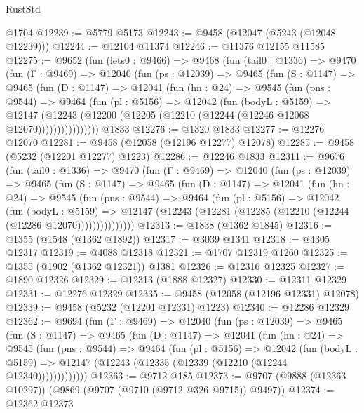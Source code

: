 \begin{lexlean}{RustStd}
\begin{coremodule}
    @1704
@12239 := @5779 @5173
@12243 := @9458 (@12047 (@5243 (@12048 @12239)))
@12244 := @12104 @11374
@12246 := @11376 @12155 @11585
@12275 := @9652
    (fun (lets0 : @9466) =>
    @9468
      (fun (tail0 : @1336) =>
      @9470
        (fun (Γ : @9469) =>
        @12040
          (fun (ps : @12039) =>
          @9465
            (fun (S : @1147) =>
            @9465
              (fun (D : @1147) =>
              @12041
                (fun (hn : @24) =>
                @9545
                  (fun (pns : @9544) =>
                  @9464
                    (fun (pl : @5156) =>
                    @12042
                      (fun (bodyL : @5159) =>
                      @12147
                        (@12243
                          (@12200 (@12205 (@12210 (@12244 (@12246 @12068 @12070))))))))))))))))
    @1833
@12276 := @1320 @1833
@12277 := @12276 @12070
@12281 := @9458 (@12058 (@12196 @12277) @12078)
@12285 := @9458 (@5232 (@12201 @12277) @1223)
@12286 := @12246 @1833
@12311 := @9676
    (fun (tail0 : @1336) =>
    @9470
      (fun (Γ : @9469) =>
      @12040
        (fun (ps : @12039) =>
        @9465
          (fun (S : @1147) =>
          @9465
            (fun (D : @1147) =>
            @12041
              (fun (hn : @24) =>
              @9545
                (fun (pns : @9544) =>
                @9464
                  (fun (pl : @5156) =>
                  @12042
                    (fun (bodyL : @5159) =>
                    @12147 (@12243 (@12281 (@12285 (@12210 (@12244 (@12286 @12070)))))))))))))))
@12313 := @1838 (@1362 @1845)
@12316 := @1355 (@1548 (@1362 @1892))
@12317 := @3039 @1341
@12318 := @4305 @12317
@12319 := @4088 @12318
@12321 := @1707 @12319 @1260
@12325 := @1355 (@1902 (@1362 @12321)) @1381
@12326 := @12316 @12325
@12327 := @1890 @12326
@12329 := @12313 (@1888 @12327)
@12330 := @12311 @12329
@12331 := @12276 @12329
@12335 := @9458 (@12058 (@12196 @12331) @12078)
@12339 := @9458 (@5232 (@12201 @12331) @1223)
@12340 := @12286 @12329
@12362 := @9694
    (fun (Γ : @9469) =>
    @12040
      (fun (ps : @12039) =>
      @9465
        (fun (S : @1147) =>
        @9465
          (fun (D : @1147) =>
          @12041
            (fun (hn : @24) =>
            @9545
              (fun (pns : @9544) =>
              @9464
                (fun (pl : @5156) =>
                @12042
                  (fun (bodyL : @5159) =>
                  @12147 (@12243 (@12335 (@12339 (@12210 (@12244 @12340)))))))))))))
@12363 := @9712 @185
@12373 := @9707 (@9888 (@12363 @10297)) (@9869 (@9707 (@9710 (@9712 @326 @9715)) @9497))
@12374 := @12362 @12373

\end{coremodule}
\end{lexlean}
